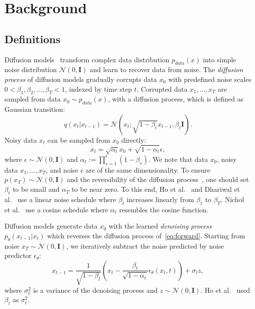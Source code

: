 \section{Background}
\label{sec:background}

\subsection{Definitions}
\label{sec:background_def}
Diffusion models~\cite{sohl2015deep,ho2020denoising} transform complex data distribution $p_{data}(x)$ into simple noise distribution $\mathcal{N}(0,\mathbf{I})$ and learn to recover data from noise.
The \textit{diffusion process} of diffusion models gradually corrupts data $x_0$ with predefined noise scales $0<\beta _1, \beta _2, ..., \beta_T <1$, indexed by time step $t$.
Corrupted data $x_1,...,x_T$ are sampled from data $x_0\sim p_{data}(x)$, with a diffusion process, which is defined as Gaussian transition:
\begin{equation}\label{eq:forward}
q(x_{t}|x_{t-1})=\mathcal{N}(x_{t};\sqrt{1-\beta _{t}}x_{t-1},\beta _{t}\mathbf{I}).
\end{equation}
Noisy data $x_t$ can be sampled from $x_0$ directly:
\begin{equation}\label{eq:closed}
x_t=\sqrt{\alpha _{t}}x_{0} + \sqrt{1-\alpha _{t}}\epsilon,
\end{equation}
where $\epsilon\sim \mathcal{N}(0,\mathbf{I})$ and $\alpha_{t}:=\prod_{s=1}^t (1-\beta _{s})$. We note that data $x_0$, noisy data $x_1,...,x_T$, and noise $\epsilon$ are of the same dimensionality. 
To ensure $p(x_T)\sim \mathcal{N}(0,\mathbf{I})$ and the reversibility of the diffusion process~\cite{sohl2015deep}, one should set $\beta_t$ to be small and $\alpha_T$ to be near zero. To this end, Ho et al.~\cite{ho2020denoising} and Dhariwal et al.~\cite{dhariwal2021diffusion} use a linear noise schedule where $\beta_t$ increases linearly from $\beta_1$ to $\beta_T$. Nichol et al.~\cite{nichol2021improved} use a cosine schedule where $\alpha_t$ resembles the cosine function.

Diffusion models generate data $x_0$ with the learned \textit{denoising process} $p_\theta(x_{t-1}|x_t)$ which reverses the diffusion process of~\cref{eq:forward}. Starting from noise $x_T\sim \mathcal{N}(0,\mathbf{I})$, we iteratively subtract the noise predicted by noise predictor $\epsilon _\theta$:
\begin{equation}\label{eq:reverse}
x_{t-1}= \frac{1}{\sqrt{1-\beta _t}}(x_t-\frac{\beta_t}{\sqrt{1-\alpha _t}}\epsilon _{\theta}(x_t,t))+\sigma _t z,
\end{equation}
where $\sigma _t^2$ is a variance of the denoising process and $z\sim \mathcal{N}(0,\mathbf{I})$. Ho et al.~\cite{ho2020denoising} used $\beta _t$ as $\sigma _t^2$.


